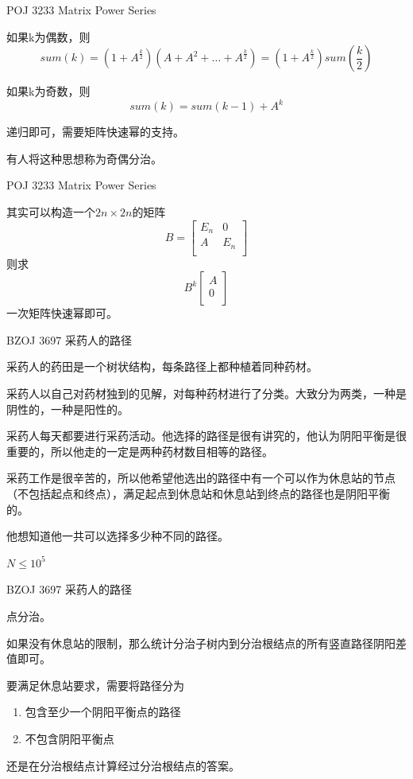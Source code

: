 \documentclass{beamer}
\begin{document}
\begin{frame}{POJ 3233 Matrix Power Series}

    如果k为偶数，则
    $$sum(k) = (1+A^{\frac{k}{2}}) ( A+A^2+\ldots+A^{\frac{k}{2}}) = (1+A^{\frac{k}{2}})  sum(\frac{k}{2})$$
    
    如果k为奇数，则
    $$sum(k) = sum(k-1) + A^k$$

    递归即可，需要矩阵快速幂的支持。

    有人将这种思想称为奇偶分治。

\end{frame}

\begin{frame}{POJ 3233 Matrix Power Series}

    其实可以构造一个$2n \times 2n$的矩阵
    $$
    B = \begin{bmatrix}
        E_n & 0 \\
        A & E_n \\
    \end{bmatrix}
    $$
    则求
    $$
    B^k \begin{bmatrix}
        A \\
        0 \\
    \end{bmatrix}
    $$
    一次矩阵快速幂即可。

\end{frame}

\begin{frame}{BZOJ 3697 采药人的路径}

    采药人的药田是一个树状结构，每条路径上都种植着同种药材。

    采药人以自己对药材独到的见解，对每种药材进行了分类。大致分为两类，一种是阴性的，一种是阳性的。

    采药人每天都要进行采药活动。他选择的路径是很有讲究的，他认为阴阳平衡是很重要的，所以他走的一定是两种药材数目相等的路径。
    
    采药工作是很辛苦的，所以他希望他选出的路径中有一个可以作为休息站的节点（不包括起点和终点），满足起点到休息站和休息站到终点的路径也是阴阳平衡的。
    
    他想知道他一共可以选择多少种不同的路径。

    $N\leq 10^5$

\end{frame}

\begin{frame}{BZOJ 3697 采药人的路径}
    
    点分治。

    如果没有休息站的限制，那么统计分治子树内到分治根结点的所有竖直路径阴阳差值即可。

    要满足休息站要求，需要将路径分为
    
    \begin{enumerate}
        \item 包含至少一个阴阳平衡点的路径
        \item 不包含阴阳平衡点
    \end{enumerate}

    还是在分治根结点计算经过分治根结点的答案。

\end{frame}
\end{document}
